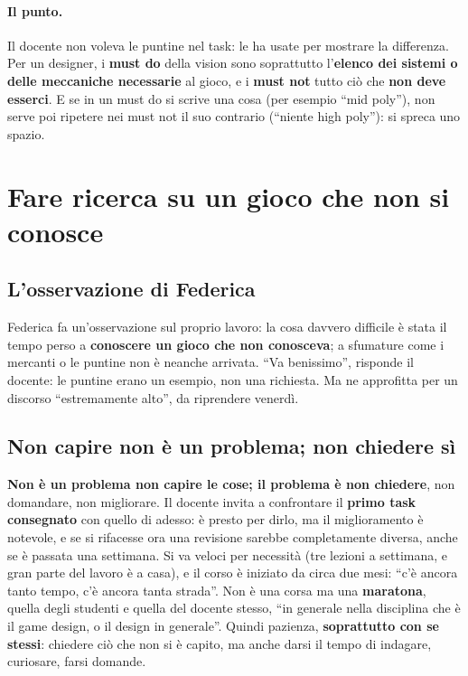 \paragraph{Il punto.} Il docente non voleva le puntine nel task: le ha usate
per mostrare la differenza. Per un designer, i \textbf{must do} della vision
sono soprattutto l'\textbf{elenco dei sistemi o delle meccaniche necessarie}
al gioco, e i \textbf{must not} tutto ciò che \textbf{non deve esserci}. E se
in un must do si scrive una cosa (per esempio ``mid poly''), non serve poi
ripetere nei must not il suo contrario (``niente high poly''): si spreca uno
spazio.

\section{Fare ricerca su un gioco che non si conosce}
\label{gd15:sec:ricerca}

\subsection{L'osservazione di Federica}

Federica fa un'osservazione sul proprio lavoro: la cosa davvero difficile è
stata il tempo perso a \textbf{conoscere un gioco che non conosceva}; a
sfumature come i mercanti o le puntine non è neanche arrivata. ``Va
benissimo'', risponde il docente: le puntine erano un esempio, non una
richiesta. Ma ne approfitta per un discorso ``estremamente alto'', da
riprendere venerdì.

\subsection{Non capire non è un problema; non chiedere sì}

\textbf{Non è un problema non capire le cose; il problema è non chiedere},
non domandare, non migliorare. Il docente invita a confrontare il
\textbf{primo task consegnato} con quello di adesso: è presto per dirlo, ma
il miglioramento è notevole, e se si rifacesse ora una revisione sarebbe
completamente diversa, anche se è passata una settimana. Si va veloci per
necessità (tre lezioni a settimana, e gran parte del lavoro è a casa), e il
corso è iniziato da circa due mesi: ``c'è ancora tanto tempo, c'è ancora
tanta strada''. Non è una corsa ma una \textbf{maratona}, quella degli
studenti e quella del docente stesso, ``in generale nella disciplina che è il
game design, o il design in generale''. Quindi pazienza, \textbf{soprattutto
con se stessi}: chiedere ciò che non si è capito, ma anche darsi il tempo di
indagare, curiosare, farsi domande.

